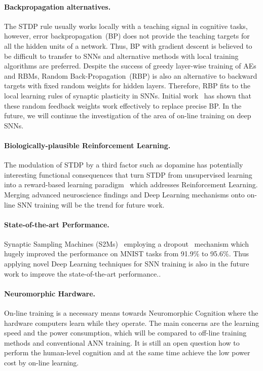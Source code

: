 \paragraph{Backpropagation alternatives.}
The STDP rule usually works locally with a teaching signal in cognitive tasks, however, error backpropagation~(BP) does not provide the teaching targets for all the hidden units of a network.
Thus, BP with gradient descent is believed to be difficult to transfer to SNNs and alternative methods with local training algorithms are preferred.
Despite the success of greedy layer-wise training of AEs and RBMs, Random Back-Propagation~(RBP) is also an alternative to backward targets with fixed random weights for hidden layers.
Therefore, RBP fits to the local learning rules of synaptic plasticity in SNNs.
Initial work~\citep{samadi2017deep,neftci2017event} has shown that these random feedback weights work effectively to replace precise BP.  
In the future, we will continue the investigation of the area of on-line training on deep SNNs.

\paragraph{Biologically-plausible Reinforcement Learning.}
The modulation of STDP by a third factor such as dopamine has potentially interesting functional consequences that turn STDP from unsupervised learning into a reward-based learning paradigm~\citep{izhikevich2007solving} which addresses Reinforcement Learning.
Merging advanced neuroscience findings and Deep Learning mechanisms onto on-line SNN training will be the trend for future work.


\paragraph{State-of-the-art Performance.}
Synaptic Sampling Machines (S2Ms)~\citep{neftci2016stochastic} employing a dropout~\citep{srivastava2014dropout} mechanism which hugely improved the performance on MNIST tasks from 91.9\% to 95.6\%.
Thus applying novel Deep Learning techniques for SNN training is also in the future work to improve the state-of-the-art performance..

\paragraph{Neuromorphic Hardware.}
On-line training is a necessary means towards Neuromorphic Cognition where the hardware computers learn while they operate.
The main concerns are the learning speed and the power consumption, which will be compared to off-line training methods and conventional ANN training.
It is still an open question how to perform the human-level cognition and at the same time achieve the low power cost by on-line learning.



